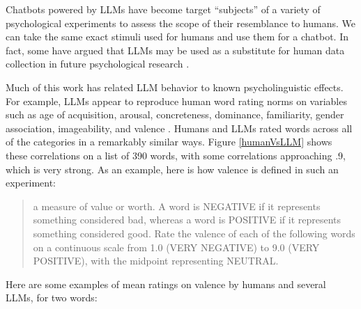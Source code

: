 Chatbots powered by LLMs have become target ``subjects'' of a variety of
psychological experiments to assess the scope of their resemblance to humans.
We can take the same exact stimuli used for humans and use them for a chatbot.
In fact, some have argued that LLMs may be used as a substitute for human data
collection in future psychological research \cite{aher2023using,
dillion2023can}.


Much of this work has related LLM behavior to known psycholinguistic effects.
For example, LLMs appear to reproduce human word rating norms on variables such
as  age of acquisition, arousal, concreteness, dominance, familiarity, gender
association, imageability, and valence \cite{trott2024augment,
kello2024emergent}. Humans and LLMs rated words across all of the categories in
a remarkably similar ways. Figure \ref{humanVsLLM} shows these
correlations on a list of 390 words, with some correlations approaching .9,
which is very strong.  As an example, here is how valence is defined in such an
experiment:
\begin{quote}
a measure of value or worth. A word is NEGATIVE if it represents something
considered bad, whereas a word is POSITIVE if it represents something
considered good. Rate the valence of each of the following words on a
continuous scale from 1.0 (VERY NEGATIVE) to 9.0 (VERY POSITIVE), with the
midpoint representing NEUTRAL.
\end{quote}
Here are some examples of mean ratings on valence by humans and several LLMs,
for two words:

